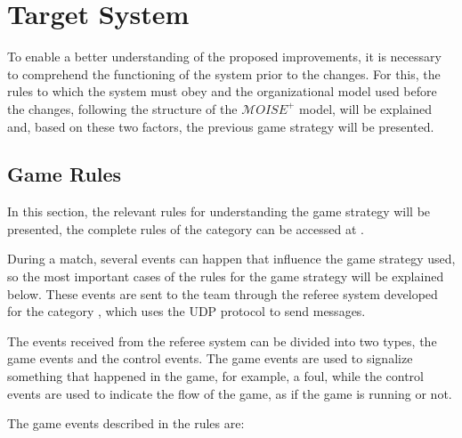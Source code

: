 \chapter{Target System}
\label{ch:target_system}

\def \MOISEp {$\mathcal{M}OISE^+$}

To enable a better understanding of the proposed improvements, it is necessary to comprehend the functioning of the system prior to the changes. For this, the rules to which the system must obey and the organizational model used before the changes, following the structure of the \MOISEp \cite{MOISEp} model, will be explained and, based on these two factors, the previous game strategy will be presented.

\section{Game Rules}
\label{sec:rules}

In this section, the relevant rules for understanding the game strategy will be presented, the complete rules of the category can be accessed at \cite{RulesVSSS}.

During a match, several events can happen that influence the game strategy used, so the most important cases of the rules for the game strategy will be explained below. These events are sent to the team through the referee system developed for the category \cite{VSSReferee}, which uses the UDP protocol to send messages.

The events received from the referee system can be divided into two types, the game events and the control events. The game events are used to signalize something that happened in the game, for example, a foul, while the control events are used to indicate the flow of the game, as if the game is running or not.

The game events described in the rules are:

